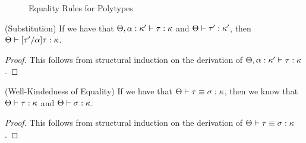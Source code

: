 \begin{figure}
\caption{Equality Rules for Polytypes}
\label{polytype-equality}
\end{figure}

\begin{prop}{(Substitution)}
If we have that $\judgeWK[\Theta, \alpha:\kappa']{\tau}{\kappa}$ and 
$\judgeWK{\tau'}{\kappa'}$, then $\judgeWK{[\tau'/\alpha]\tau}{\kappa}$. 
\end{prop}
\begin{proof}
This follows from structural induction on the derivation of 
$\judgeWK[\Theta, \alpha:\kappa']{\tau}{\kappa}$. 
\end{proof}


\begin{prop}{(Well-Kindedness of Equality)}
If we have that $\judgeKeq{\tau}{\sigma}{\kappa}$, then we know that 
$\judgeWK{\tau}{\kappa}$ and $\judgeWK{\sigma}{\kappa}$. 
\end{prop}
\begin{proof}
This follows from structural induction on the derivation of   
$\judgeKeq{\tau}{\sigma}{\kappa}$.
\end{proof}

